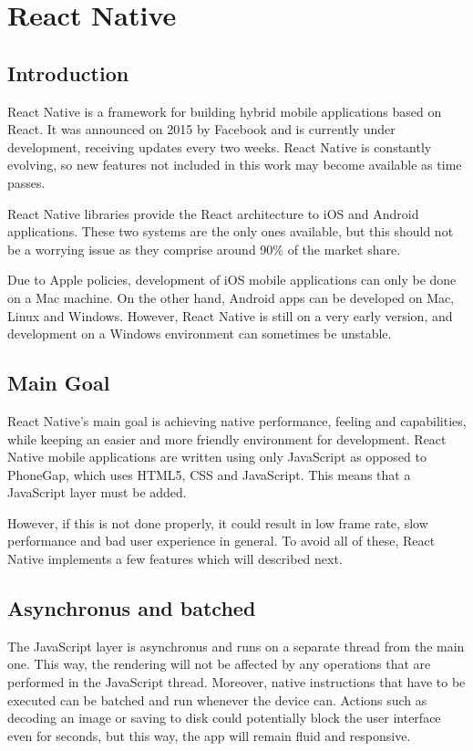 \chapter{React Native}
\justifying
\section{Introduction}

React Native is a framework for building hybrid mobile applications based on React. It was announced on 2015 by Facebook and is currently under development, receiving updates every two weeks. React Native is constantly evolving, so new features not included in this work may become available as time passes.

React Native libraries provide the React architecture to iOS and Android applications. These two systems are the only ones available, but this should not be a worrying issue as they comprise around 90\% of the market share.

Due to Apple policies, development of iOS mobile applications can only be done on a Mac machine. On the other hand, Android apps can be developed on Mac, Linux and Windows. However, React Native is still on a very early version, and development on a Windows environment can sometimes be unstable.

\section{Main Goal}

React Native's main goal is achieving native performance, feeling and capabilities, while keeping an easier and more friendly environment for development. React Native mobile applications are written using only JavaScript as opposed to PhoneGap, which uses HTML5, CSS and JavaScript. This means that a JavaScript layer must be added.

However, if this is not done properly, it could result in low frame rate, slow performance and bad user experience in general. To avoid all of these, React Native implements a few features which will described next.

\section{Asynchronus and batched} 

The JavaScript layer is asynchronus and runs on a separate thread from the main one. This way, the rendering will not be affected by any operations that are performed in the JavaScript thread. Moreover, native instructions that have to be executed can be batched and run whenever the device can. Actions such as decoding an image or saving to disk could potentially block the user interface even for seconds, but this way, the app will remain fluid and responsive.

